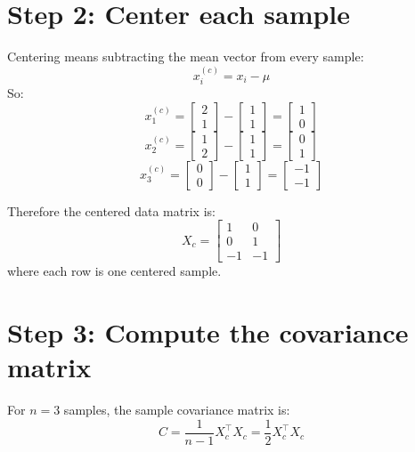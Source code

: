 \documentclass[11pt]{article}
\begin{document}
\section{Step 2: Center each sample}
Centering means subtracting the mean vector from every sample:
\[
  x_i^{(c)} = x_i - \mu
\]
So:
\[
  x_1^{(c)} =
  \begin{bmatrix}
    2\\1
  \end{bmatrix}
  -
  \begin{bmatrix}
    1\\1
  \end{bmatrix}
  =
  \begin{bmatrix}
    1\\0
  \end{bmatrix}
\]
\[
  x_2^{(c)} =
  \begin{bmatrix}
    1\\2
  \end{bmatrix}
  -
  \begin{bmatrix}
    1\\1
  \end{bmatrix}
  =
  \begin{bmatrix}
    0\\1
  \end{bmatrix}
\]
\[
  x_3^{(c)} =
  \begin{bmatrix}
    0\\0
  \end{bmatrix}
  -
  \begin{bmatrix}
    1\\1
  \end{bmatrix}
  =
  \begin{bmatrix}
    -1\\-1
  \end{bmatrix}
\]

Therefore the centered data matrix is:
\[
  X_c =
  \begin{bmatrix}
    1 & 0\\
    0 & 1\\
    -1 & -1
  \end{bmatrix}
\]
where each row is one centered sample.

\section{Step 3: Compute the covariance matrix}
For $n=3$ samples, the sample covariance matrix is:
\[
  C = \frac{1}{n-1} X_c^\top X_c = \frac{1}{2} X_c^\top X_c
\]
\end{document}
